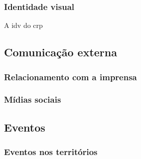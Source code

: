 \subsubsection{Identidade visual}

A \gls{idv} do \ac{crp}

\subsection{Comunicação externa}

\subsubsection{Relacionamento com a imprensa}

\subsubsection{Mídias sociais}

\subsection{Eventos}

\subsubsection{Eventos nos territórios}

